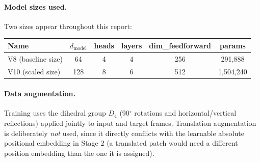 \paragraph{Model sizes used.} Two sizes appear throughout this report:

\begin{center}
\begin{tabular}{lccccc}
\toprule
Name & $d_{\text{model}}$ & heads & layers & dim\_feedforward & params \\
\midrule
V8 (baseline size)  & 64  & 4 & 4 & 256 & 291{,}888 \\
V10 (scaled size)   & 128 & 8 & 6 & 512 & 1{,}504{,}240 \\
\bottomrule
\end{tabular}
\end{center}

\paragraph{Data augmentation.} Training uses the dihedral group $D_4$
(90$^\circ$ rotations and horizontal/vertical reflections) applied jointly
to input and target frames. Translation augmentation is deliberately
\emph{not} used, since it directly conflicts with the learnable absolute
positional embedding in Stage 2 (a translated patch would need a different
position embedding than the one it is assigned).
